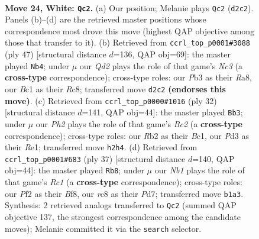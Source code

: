 \documentclass[11pt]{article}
\begin{document}
\clearpage

\begin{figure}[p]\centering
\begin{subfigure}{0.46\textwidth}\centering
\resizebox{\linewidth}{!}{%
\newchessgame
\chessboard[
  setfen={2rq1r2/4bp1k/2n2n2/p6p/1p1p2p1/1P1P2P1/PR1Q1P1P/RNB1N1K1 w - - 4 24},
  showmover=false,
  pgfstyle=straightmove, color=movearrow, markmove={d2-c2}
]}
\caption{}
\end{subfigure}\hfill
\begin{subfigure}{0.46\textwidth}\centering
\resizebox{\linewidth}{!}{%
\newchessgame
\chessboard[
  setfen={r1rq1nk1/1p2bpp1/2n1p3/p2pP1P1/P2P1N2/4BN2/1P2QP2/3R1RK1 b - - 2 24},
  showmover=false,
  pgfstyle=straightmove, color=movearrow, markmove={c6-b4}
]}
\caption{}
\end{subfigure}
\\[4pt]
\begin{subfigure}{0.46\textwidth}\centering
\resizebox{\linewidth}{!}{%
\newchessgame
\chessboard[
  setfen={r2qr1k1/1b2bppp/p1np1n2/1p2p1N1/1P2P3/3P2N1/P1B2PPP/R1BQR1K1 w - - 1 17},
  showmover=false,
  pgfstyle=straightmove, color=movearrow, markmove={c2-b3}
]}
\caption{}
\end{subfigure}\hfill
\begin{subfigure}{0.46\textwidth}\centering
\resizebox{\linewidth}{!}{%
\newchessgame
\chessboard[
  setfen={2r1rbk1/1b1pqpp1/pPn1p2p/4P3/1p1P4/1N3N1P/1P2BPP1/R2QR1K1 b - - 0 19},
  showmover=false,
  pgfstyle=straightmove, color=movearrow, markmove={c8-b8}
]}
\caption{}
\end{subfigure}
\caption{\textbf{Move 24, White: \texttt{Qc2}.} (a) Our position; Melanie plays \texttt{Qc2} (\texttt{d2c2}). Panels (b)--(d) are the retrieved master positions whose correspondence most drove this move (highest QAP objective among those that transfer to it). (b) Retrieved from \texttt{ccrl\_top\_p0001\#3088} (ply 47) [structural distance $d$=136, QAP obj=69]: the master played \texttt{Nb4}; under $\mu$ our \emph{Qd2} plays the role of that game's \emph{Nc3} (a \textbf{cross-type} correspondence); cross-type roles: our \emph{P}b3 as their \emph{R}a8, our \emph{B}c1 as their \emph{R}c8; transferred move \texttt{d2c2} \textbf{(endorses this move)}. (c) Retrieved from \texttt{ccrl\_top\_p0000\#1016} (ply 32) [structural distance $d$=141, QAP obj=44]: the master played \texttt{Bb3}; under $\mu$ our \emph{Ph2} plays the role of that game's \emph{Bc2} (a \textbf{cross-type} correspondence); cross-type roles: our \emph{R}b2 as their \emph{B}c1, our \emph{P}d3 as their \emph{R}e1; transferred move \texttt{h2h4}. (d) Retrieved from \texttt{ccrl\_top\_p0001\#683} (ply 37) [structural distance $d$=140, QAP obj=44]: the master played \texttt{Rb8}; under $\mu$ our \emph{Nb1} plays the role of that game's \emph{Rc1} (a \textbf{cross-type} correspondence); cross-type roles: our \emph{P}f2 as their \emph{B}f8, our \emph{r}c8 as their \emph{P}d7; transferred move \texttt{b1a3}. Synthesis: 2 retrieved analogs transferred to \texttt{Qc2} (summed QAP objective 137, the strongest correspondence among the candidate moves); Melanie committed it via the \texttt{search} selector.}
\label{fig:thought-m46}
\end{figure}
\end{document}
